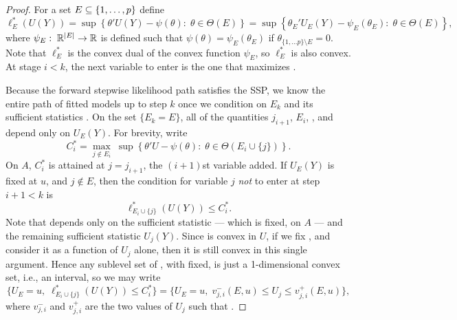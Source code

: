 \documentclass{article}
\begin{document}
\begin{proof}
  For a set $E\subseteq \{1,\ldots,p\}$ define
  \[
  \ell_E^*(U(Y)) 
  = \sup\left\{\theta'U(Y) - \psi(\theta) :\; \theta\in \Theta(E) \right\}
  = \sup\left\{\theta_E'U_E(Y) - \psi_E(\theta_E):\; \theta\in\Theta(E) \right\},
  \]
  where $\psi_E:\; \mathbb{R}^{|E|} \rightarrow \mathbb{R}$ is defined such that $\psi(\theta)=\psi_E(\theta_E)$ if $\theta_{\{1,\ldots p\}\setminus E}=0$. Note that $\ell_E^*$ is the convex dual of the convex function $\psi_E$, so $\ell_E^*$ is also convex.   At stage $i<k$, the next variable to enter is the one that maximizes .

  Because the forward stepwise likelihood path satisfies the SSP, we know the entire path of fitted models up to step $k$ once we condition on $E_k$ and its sufficient statistics . On the set $\{E_k=E\}$, all of the quantities $j_{i+1}$, $E_i$, , and  depend only on $U_E(Y)$. For brevity, write 
  \[
  C_i^* = \max_{j \notin E_i} \;
    \sup \left\{ \theta ' U - \psi(\theta):\; \theta \in \Theta(E_i\cup \{j\}) \right\}.
  \]
  On $A$, $C_i^*$ is attained at $j=j_{i+1}$, the $(i+1)$st variable added.  If $U_E(Y)$ is fixed at $u$, and $j \notin E$, then the condition for 
  variable $j$ {\em not} to enter at step $i+1 < k$ is
  \[
  \ell_{E_i\cup \{j\}}^*(U(Y)) \leq C_i^*.
  \]
  Note that  depends only on the sufficient statistic  --- which is fixed, on $A$ --- and the remaining sufficient statistic $U_j(Y)$. Since  is convex in $U$, if we fix , and consider it as a function of $U_j$ alone, then it is still convex in this single argument.  Hence any sublevel set of , with  fixed, is just a 1-dimensional convex set, i.e., an interval, so we may write
  \begin{equation}\label{eq:noEnterBounds_FSL}
  \{U_E=u, \; \ell_{E_i\cup \{j\}}^*(U(Y)) \leq C_i^*\} 
  = \{ U_E=u, \; v_{j,i}^-(E,u) \leq U_j \leq v_{j,i}^+(E,u)\},
  \end{equation}
  where $v_{j,i}^{-}$ and $v_{j,i}^+$ are the two values of $U_j$ such that .


\end{proof}
\end{document}
